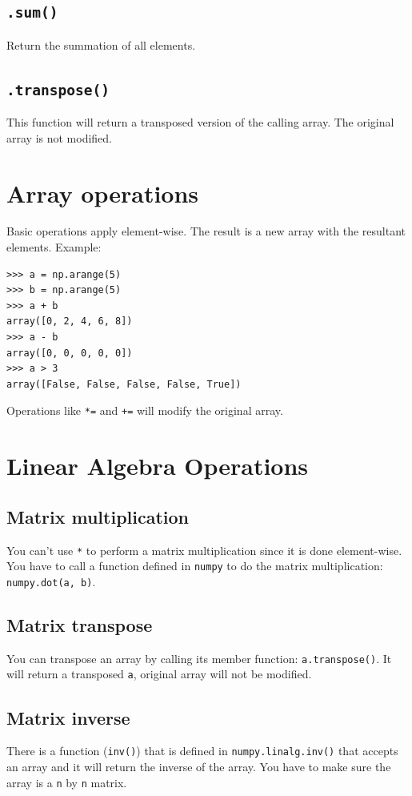 \documentclass[12pt]{book}
\begin{document}
\subsection{\texttt{.sum()}}
\label{sec:orgf537e2c}
Return the summation of all elements.
\subsection{\texttt{.transpose()}}
\label{sec:orgdc0aaaf}
This function will return a transposed version of the calling array. The original array is not modified.
\section{Array operations}
\label{sec:org05b9299}
Basic operations apply element-wise. The result is a new array with the resultant elements. Example:
\begin{verbatim}
>>> a = np.arange(5)
>>> b = np.arange(5)
>>> a + b
array([0, 2, 4, 6, 8])
>>> a - b
array([0, 0, 0, 0, 0])
>>> a > 3
array([False, False, False, False, True])
\end{verbatim}

Operations like \texttt{*=} and \texttt{+=} will modify the original array.
\section{Linear Algebra Operations}
\label{sec:orga07cd70}
\subsection{Matrix multiplication}
\label{sec:orgca63ddf}
You can't use \texttt{*} to perform a matrix multiplication since it is done element-wise. You have to call a function defined in \texttt{numpy} to do the matrix multiplication: \texttt{numpy.dot(a, b)}.
\subsection{Matrix transpose}
\label{sec:org428bf72}
You can transpose an array by calling its member function: \texttt{a.transpose()}. It will return a transposed \texttt{a}, original array will not be modified.
\subsection{Matrix inverse}
\label{sec:orgacd07ee}
There is a function (\texttt{inv()}) that is defined in \texttt{numpy.linalg.inv()} that accepts an array and it will return the inverse of the array. You have to make sure the array is a \texttt{n} by \texttt{n} matrix.
\end{document}
